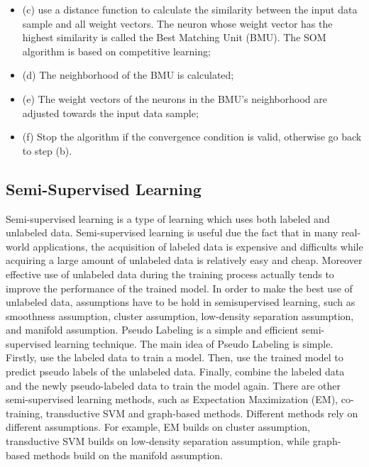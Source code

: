 \begin{itemize}
\begin{itemize}
\item[](c) use a distance function to calculate the similarity between the input data sample and all weight vectors. The neuron whose weight vector has the highest similarity is called the Best Matching Unit (BMU). The SOM algorithm is based on competitive learning;
\item[](d) The neighborhood of the BMU is calculated;
\item[](e) The weight vectors of the neurons in the BMU’s neighborhood are adjusted towards the input data sample;
\item[](f) Stop the algorithm if the convergence condition is valid, otherwise go back to step (b).
\end{itemize}
\end{itemize}
\subsection{Semi-Supervised Learning}
Semi-supervised learning is a type of learning which uses both labeled and unlabeled data. Semi-supervised learning is useful due the fact that in many real-world applications, the acquisition of labeled data is expensive and difficults while acquiring a large amount of unlabeled data is relatively easy and cheap. Moreover effective use of unlabeled data during the training process actually tends to improve the performance of the trained model. In order to make the best use of unlabeled data, assumptions have to be hold in semisupervised learning, such as smoothness assumption, cluster assumption, low-density separation assumption, and manifold assumption. Pseudo Labeling \cite{Wu2018} is a simple and efficient semi-supervised learning technique. The main idea of Pseudo Labeling is simple. Firstly, use the labeled data to train a model. Then, use the trained model to predict pseudo labels of the unlabeled data. Finally, combine the labeled data and the newly pseudo-labeled data to train the model again. There are other semi-supervised learning methods, such as Expectation Maximization (EM), co-training, transductive SVM and graph-based methods. Different methods rely on different assumptions. For example, EM builds on cluster assumption, transductive SVM builds on low-density separation assumption, while graph-based methods build on the manifold assumption.
